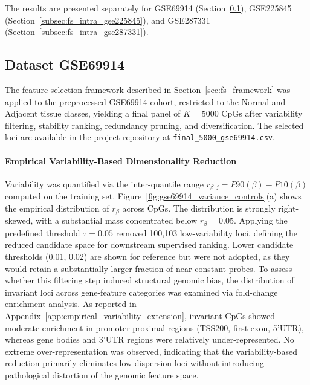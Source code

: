 The results are presented separately for GSE69914 (Section~\ref{subsec:fs_intra_gse69914}), GSE225845 (Section~\ref{subsec:fs_intra_gse225845}), and GSE287331 (Section~\ref{subsec:fs_intra_gse287331}).

\subsection{Dataset GSE69914}
\label{subsec:fs_intra_gse69914}

The feature selection framework described in Section~\ref{sec:fs_framework} 
was applied to the preprocessed GSE69914 cohort, restricted to the 
Normal and Adjacent tissue classes, yielding a final panel of 
$K=5000$ CpGs after variability filtering, stability ranking, 
redundancy pruning, and diversification. The selected loci are 
available in the project repository at 
\href{https://github.com/elisabettaroviera/THESIS/blob/main/05%20-%20CpG%20list/Final%205000%20CpGs%20per%20Dataset/final_5000_gse69914.csv}
{\texttt{final\_5000\_gse69914.csv}}.

\paragraph{Empirical Variability-Based Dimensionality Reduction}

Variability was quantified via the inter-quantile range 
$r_{\beta,j} = P90(\beta) - P10(\beta)$ computed on the 
training set. Figure~\ref{fig:gse69914_variance_controls}(a) 
shows the empirical distribution of $r_{\beta}$ across CpGs. 
The distribution is strongly right-skewed, with a substantial 
mass concentrated below $r_{\beta}=0.05$. 
Applying the predefined threshold $\tau = 0.05$ removed 
100{,}103 low-variability loci, defining the reduced candidate 
space for downstream supervised ranking. Lower candidate 
thresholds (0.01, 0.02) are shown for reference but were not 
adopted, as they would retain a substantially larger fraction 
of near-constant probes. To assess whether this filtering step induced structural genomic bias,
the distribution of invariant loci across gene-feature categories
was examined via fold-change enrichment analysis.
As reported in Appendix~\ref{app:empirical_variability_extension},
invariant CpGs showed moderate enrichment in promoter-proximal
regions (TSS200, first exon, 5'UTR), whereas gene bodies and 3'UTR regions were relatively under-represented.
No extreme over-representation was observed, indicating that the
variability-based reduction primarily eliminates low-dispersion loci
without introducing pathological distortion of the genomic feature space.

